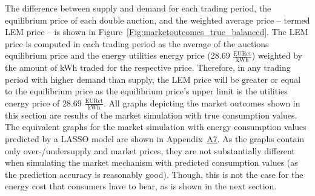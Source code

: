 The difference between supply and demand for each trading period, the equilibrium price of each double auction, and the weighted average price -- termed LEM price -- is shown in Figure~\ref{Fig:marketoutcomes_true_balanced}. The LEM price is computed in each trading period as the average of the auctions equilibrium price and the energy utilities energy price (28.69 $\frac{\text{EURct}}{\text{kWh}}$) weighted by the amount of kWh traded for the respective price. Therefore, in any trading period with higher demand than supply, the LEM price will be greater or equal to the equilibrium price as the equilibrium price's upper limit is the utilities energy price of 28.69 $\frac{\text{EURct}}{\text{kWh}}$. All graphs depicting the market outcomes shown in this section are results of the market simulation with true consumption values. The equivalent graphs for the market simulation with energy consumption values predicted by a LASSO model are shown in Appendix~\hyperlink{AppA7:Figures:marketsimulation_pred}{A7}. As the graphs contain only over-/undersupply and market prices, they are not substantially different when simulating the market mechanism with predicted consumption values (as the prediction accuracy is reasonably good). Though, this is not the case for the energy cost that consumers have to bear, as is shown in the next section.

